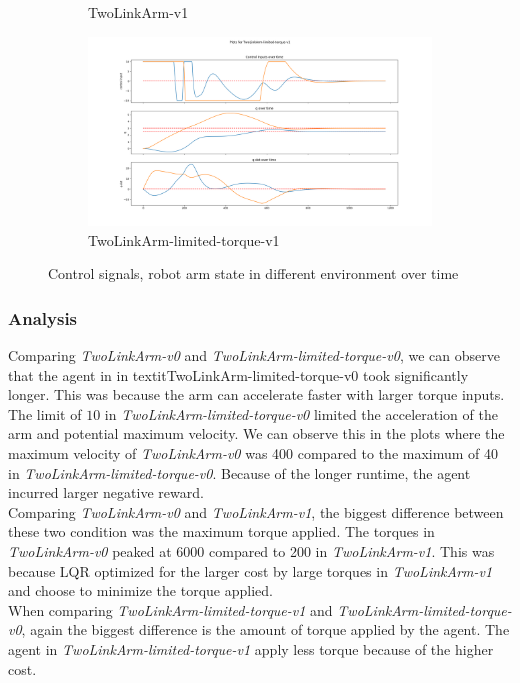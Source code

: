 \documentclass[hidelinks]{scrartcl}
\begin{document}
\begin{figure}[H]
\begin{subfigure}[b]{0.45\textwidth}
        \caption{TwoLinkArm-v1}
    \end{subfigure}
    \begin{subfigure}[b]{0.45\textwidth}
        \includegraphics[width=\textwidth]{figures/twolinkarm-limited-v1}
        \caption{TwoLinkArm-limited-torque-v1}
    \end{subfigure}
    \caption{Control signals, robot arm state in different environment over time}\label{fig:LQR_state}
\end{figure}
\subsubsection*{Analysis}
Comparing \textit{TwoLinkArm-v0} and \textit{TwoLinkArm-limited-torque-v0}, we can observe that the agent in in textit{TwoLinkArm-limited-torque-v0} took significantly longer. This was because the arm can accelerate faster with larger torque inputs. The limit of $10$ in \textit{TwoLinkArm-limited-torque-v0} limited the acceleration of the arm and potential maximum velocity. We can observe this in the plots where the maximum velocity of \textit{TwoLinkArm-v0} was 400 compared to the maximum of 40 in \textit{TwoLinkArm-limited-torque-v0}. Because of the longer runtime, the agent incurred larger negative reward.\\
Comparing \textit{TwoLinkArm-v0} and \textit{TwoLinkArm-v1}, the biggest difference between these two condition was the maximum torque applied. The torques in \textit{TwoLinkArm-v0} peaked at 6000 compared to 200 in \textit{TwoLinkArm-v1}. This was because LQR optimized for the larger cost by large torques in \textit{TwoLinkArm-v1} and choose to minimize the torque applied.\\
When comparing \textit{TwoLinkArm-limited-torque-v1} and \textit{TwoLinkArm-limited-torque-v0}, again the biggest difference is the amount of torque applied by the agent. The agent in \textit{TwoLinkArm-limited-torque-v1} apply less torque because of the higher cost.
\end{document}
